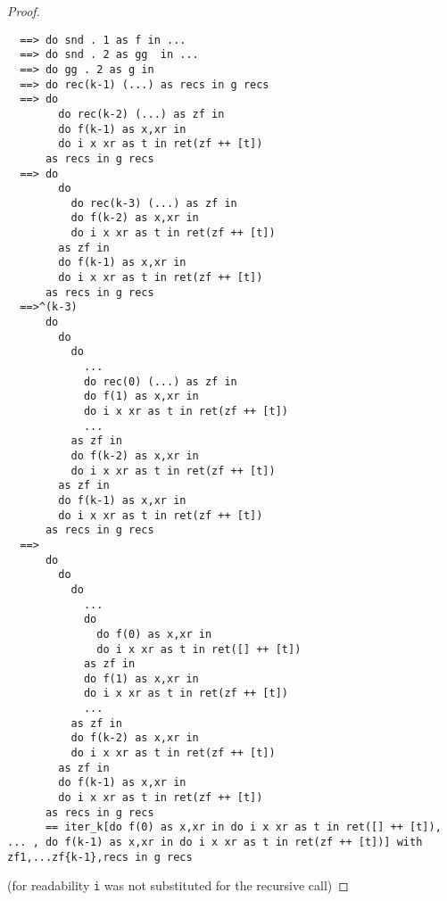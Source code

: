 \begin{proof}
\begin{verbatim}
  ==> do snd . 1 as f in ...
  ==> do snd . 2 as gg  in ...
  ==> do gg . 2 as g in 
  ==> do rec(k-1) (...) as recs in g recs
  ==> do 
        do rec(k-2) (...) as zf in 
        do f(k-1) as x,xr in 
        do i x xr as t in ret(zf ++ [t])
      as recs in g recs
  ==> do 
        do 
          do rec(k-3) (...) as zf in 
          do f(k-2) as x,xr in 
          do i x xr as t in ret(zf ++ [t])
        as zf in 
        do f(k-1) as x,xr in 
        do i x xr as t in ret(zf ++ [t])
      as recs in g recs
  ==>^(k-3) 
      do 
        do 
          do 
            ...
            do rec(0) (...) as zf in
            do f(1) as x,xr in 
            do i x xr as t in ret(zf ++ [t])
            ...
          as zf in 
          do f(k-2) as x,xr in 
          do i x xr as t in ret(zf ++ [t])
        as zf in 
        do f(k-1) as x,xr in 
        do i x xr as t in ret(zf ++ [t])
      as recs in g recs
  ==>
      do 
        do 
          do 
            ...
            do 
              do f(0) as x,xr in 
              do i x xr as t in ret([] ++ [t]) 
            as zf in
            do f(1) as x,xr in 
            do i x xr as t in ret(zf ++ [t])
            ...
          as zf in 
          do f(k-2) as x,xr in 
          do i x xr as t in ret(zf ++ [t])
        as zf in 
        do f(k-1) as x,xr in 
        do i x xr as t in ret(zf ++ [t])
      as recs in g recs
      == iter_k[do f(0) as x,xr in do i x xr as t in ret([] ++ [t]), ... , do f(k-1) as x,xr in do i x xr as t in ret(zf ++ [t])] with zf1,...zf{k-1},recs in g recs
  \end{verbatim}
  (for readability \texttt{i} was not substituted for the recursive call)


\end{proof}
